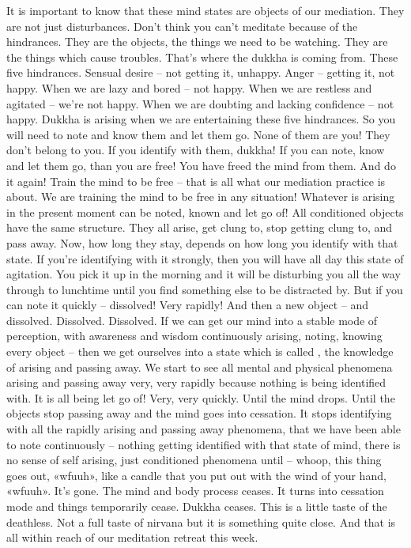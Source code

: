 \documentclass[letterpaper,10pt,english]{sphinxmanual}
\begin{document}
\sphinxAtStartPar
It is important to know that these mind states are objects of our mediation. They are not just disturbances. Don’t think you can’t meditate because
of the hindrances. They are the objects, the things we need to be watching.
They are the things which cause troubles. That’s where the dukkha is coming
from. These five hindrances. Sensual desire – not getting it, unhappy. Anger
– getting it, not happy. When we are lazy and bored – not happy. When we
are restless and agitated – we’re not happy. When we are doubting and lacking  confidence  –  not  happy.  Dukkha  is  arising  when  we  are  entertaining
these five hindrances. So you will need to note and know them and let them
go. None of them are you! They don’t belong to you. If you identify with
them,  dukkha!  If  you  can  note,  know  and  let  them  go,  than  you  are  free!
You have freed the mind from them. And do it again! Train the mind to be
free – that is all what our mediation practice is about. We are training the
mind to be free in any situation! Whatever is arising in the present moment
can be noted, known and let go of! All conditioned objects have the same
structure. They all arise, get clung to, stop getting clung to, and pass away.
Now, how long they stay, depends on how long you identify with that state.
If you’re identifying with it strongly, then you will have all day this state of
agitation. You pick it up in the morning and it will be disturbing you all the
  way through to lunchtime until you find something else to be distracted by.
But  if  you  can  note  it  quickly  –  dissolved! Very  rapidly! And  then  a  new
object – and dissolved. Dissolved. Dissolved. If we can get our mind into a
stable mode of perception, with awareness and wisdom continuously arising, noting, knowing every object – then we get ourselves into a state which
is called
, the knowledge of arising and passing away. We
start  to  see  all  mental  and  physical  phenomena  arising  and  passing  away
very, very rapidly because nothing is being identified with. It is all being let
go of! Very, very quickly. Until the mind drops. Until the objects stop passing away and the mind goes into cessation. It stops identifying with all the
rapidly arising and passing away phenomena, that we have been able to note
continuously – nothing getting identified with that state of mind, there is no
sense of self arising, just conditioned phenomena until – whoop, this thing
goes out, «wfuuh», like a candle that you put out with the wind of your hand,
«wfuuh». It’s gone. The mind and body process ceases. It turns into cessation
mode and things temporarily cease. Dukkha ceases. This is a little taste of
the deathless. Not a full taste of nirvana but it is something quite close. And
that is all within reach of our meditation retreat this week.
\end{document}
